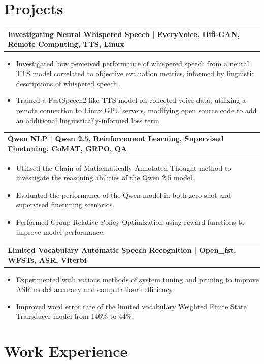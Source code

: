 \documentclass[a4paper,12pt]{article}
\makeatletter
\newenvironment{joblong}[2]
    {
    \begin{tabularx}{\linewidth}{@{}l X r@{}}
    \textbf{#1} & \hfill &  #2 \\[3.75pt]
    \end{tabularx}
    \begin{minipage}[t]{\linewidth}
    \begin{itemize}[nosep,after=\strut, leftmargin=1em, itemsep=3pt, label=\textcolor{linkcolour}{\textbullet}]
    }
    {
    \end{itemize}
    \end{minipage}    
    }
\makeatother
\begin{document}


\section{Projects}


\begin{joblong}{Investigating Neural Whispered Speech | \normalfont EveryVoice, Hifi-GAN, Remote Computing, TTS, Linux}{}
\item Investigated how perceived performance of whispered speech from a neural TTS model correlated to objective evaluation metrics, informed by linguistic descriptions of whispered speech.
\item Trained a FastSpeech2-like TTS model on collected voice data, utilizing a remote connection to Linux GPU servers, modifying open source code to add an additional linguistically-informed loss term.
\end{joblong}

\begin{joblong}{Qwen NLP | \normalfont Qwen 2.5, Reinforcement Learning, Supervised Finetuning, CoMAT, GRPO, QA }{}   
\item Utilised the Chain of Mathematically Annotated Thought method to investigate the reasoning abilities of the Qwen 2.5 model.
\item Evaluated the performance of the Qwen model in both zero-shot and supervised finetuning scenarios.
\item Performed Group Relative Policy Optimization using reward functions to improve model performance.
\end{joblong}  
\begin{joblong}{Limited Vocabulary Automatic Speech Recognition | \normalfont Open\_fst, WFSTs, ASR, Viterbi}{}  
\item Experimented with various methods of system tuning and pruning to improve ASR model accuracy and computational efficiency.
\item Improved word error rate of the limited vocabulary Weighted Finite State Transducer model from 146\% to 44\%.
\end{joblong}


\section{Work Experience}
\end{document}
